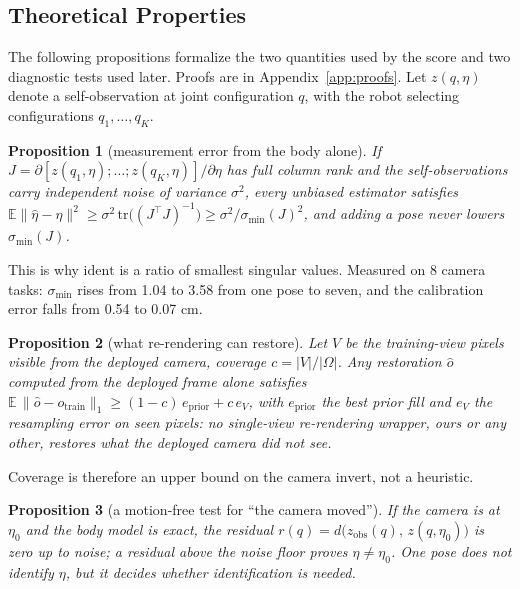 \documentclass{article}
\newtheorem{proposition}{Proposition}
\newcommand{\ident}{\mathrm{ident}}
\newcommand{\invert}{\mathrm{invert}}
\begin{document}
\subsection{Theoretical Properties}

\label{sec:theory}

The following propositions formalize the two quantities used by the score and two diagnostic tests used later.
Proofs are in Appendix~\ref{app:proofs}. Let $z(q,\eta)$ denote a self-observation at joint configuration $q$, with
the robot selecting configurations $q_1,\dots,q_K$.

\begin{proposition}[measurement error from the body alone]
\label{prop:cr}
If $J = \partial [z(q_1,\eta); \dots; z(q_K,\eta)] / \partial\eta$ has full column rank and the self-observations
carry independent noise of variance $\sigma^2$, every unbiased estimator satisfies $\mathbb{E}\|\hat\eta - \eta\|^2 \ge
\sigma^2\,\mathrm{tr}\big((J^\top J)^{-1}\big) \ge \sigma^2 / \sigma_{\min}(J)^2$, and adding a pose never lowers
$\sigma_{\min}(J)$.
\end{proposition}
This is why $\ident$ is a ratio of smallest singular values. Measured on 8 camera tasks: $\sigma_{\min}$ rises from
1.04 to 3.58 from one pose to seven, and the calibration error falls from 0.54 to 0.07 cm.

\begin{proposition}[what re-rendering can restore]
\label{prop:cov}
Let $V$ be the training-view pixels visible from the deployed camera, coverage $c = |V|/|\Omega|$. Any restoration
$\hat o$ computed from the deployed frame alone satisfies $\mathbb{E}\,\|\hat o - o_{\mathrm{train}}\|_1 \ge
(1-c)\,e_{\mathrm{prior}} + c\,e_V$, with $e_{\mathrm{prior}}$ the best prior fill and $e_V$ the resampling error on
seen pixels: no single-view re-rendering wrapper, ours or any other, restores what the deployed camera did not see.
\end{proposition}
Coverage is therefore an upper bound on the camera $\invert$, not a heuristic.

\begin{proposition}[a motion-free test for ``the camera moved'']
\label{prop:static}
If the camera is at $\eta_0$ and the body model is exact, the residual $r(q) = d\big(z_{\mathrm{obs}}(q),\,
z(q,\eta_0)\big)$ is zero up to noise; a residual above the noise floor proves $\eta \ne \eta_0$. One pose does not
identify $\eta$, but it decides whether identification is needed.
\end{proposition}
\end{document}
